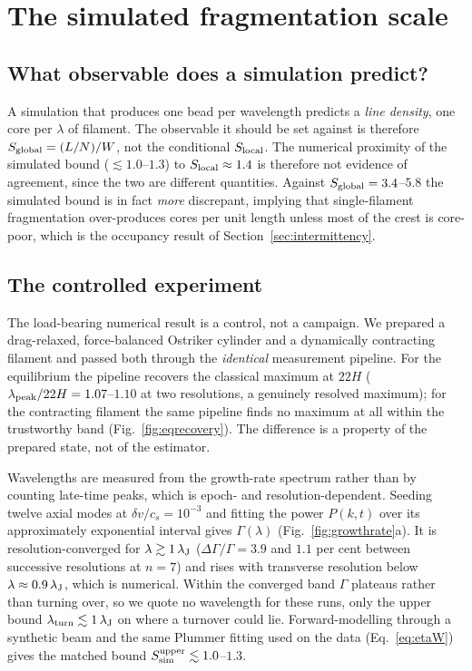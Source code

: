 \documentclass[usenatbib,twoside,twocolumn]{mnras}
\begin{document}
\section{The simulated fragmentation scale}
\label{sec:validation_endtoend}

\subsection{What observable does a simulation predict?}
\label{sec:whatobservable}

A simulation that produces one bead per wavelength predicts a \emph{line density}, one core per $\lambda$ of filament. The observable it should be set against is therefore $S_{\rm global}=(L/N)/W$, not the conditional $S_{\rm local}$. The numerical proximity of the simulated bound ($\lesssim1.0$--$1.3$) to $S_{\rm local}\approx1.4$ is therefore not evidence of agreement, since the two are different quantities. Against $S_{\rm global}=3.4$--$5.8$ the simulated bound is in fact \emph{more} discrepant, implying that single-filament fragmentation over-produces cores per unit length unless most of the crest is core-poor, which is the occupancy result of Section~\ref{sec:intermittency}.

\subsection{The controlled experiment}
\label{sec:control}

The load-bearing numerical result is a control, not a campaign. We prepared a drag-relaxed, force-balanced Ostriker cylinder and a dynamically contracting filament and passed both through the \emph{identical} measurement pipeline. For the equilibrium the pipeline recovers the classical maximum at $22H$ ($\lambda_{\rm peak}/22H=1.07$--$1.10$ at two resolutions, a genuinely resolved maximum); for the contracting filament the same pipeline finds no maximum at all within the trustworthy band (Fig.~\ref{fig:eqrecovery}). The difference is a property of the prepared state, not of the estimator.

Wavelengths are measured from the growth-rate spectrum rather than by counting late-time peaks, which is epoch- and resolution-dependent. Seeding twelve axial modes at $\delta v/c_s=10^{-3}$ and fitting the power $P(k,t)$ over its approximately exponential interval gives $\Gamma(\lambda)$ (Fig.~\ref{fig:growthrate}a). It is resolution-converged for $\lambda\gtrsim1\,\lambda_{\rm J}$ ($\Delta\Gamma/\Gamma=3.9$ and $1.1$ per cent between successive resolutions at $n=7$) and rises with transverse resolution below $\lambda\approx0.9\,\lambda_{\rm J}$, which is numerical. Within the converged band $\Gamma$ plateaus rather than turning over, so we quote no wavelength for these runs, only the upper bound $\lambda_{\rm turn}\lesssim1\,\lambda_{\rm J}$ on where a turnover could lie. Forward-modelling through a synthetic beam and the same Plummer fitting used on the data (Eq.~\ref{eq:etaW}) gives the matched bound $S_{\rm sim}^{\rm upper}\lesssim1.0$--$1.3$.
\end{document}
